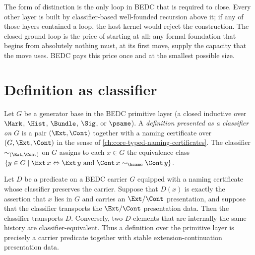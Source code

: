 \begin{remark}
\label{rem:ground-loop-must-close}
The form of distinction is the only loop in BEDC that is required to close. Every other layer is built by classifier-based well-founded recursion above it; if any of those layers contained a loop, the host kernel would reject the construction. The closed ground loop is the price of starting at all: any formal foundation that begins from absolutely nothing must, at its first move, supply the capacity that the move uses. BEDC pays this price once and at the smallest possible size.
\end{remark}

\section{Definition as classifier}
\label{sec:reflection-def-as-classifier}

\begin{definition}
\label{def:definition-as-classifier}
Let $G$ be a generator base in the BEDC primitive layer (a closed inductive over $\Mark$, $\Hist$, $\Bundle$, $\Sig$, or $\psame$). A \emph{definition presented as a classifier on $G$} is a pair $(\Ext, \Cont)$ together with a naming certificate over $(G, \Ext, \Cont)$ in the sense of \autoref{ch:core-typed-naming-certificates}. The classifier $\sim_{(\Ext, \Cont)}$ on $G$ assigns to each $x \in G$ the equivalence class $\{ y \in G \mid \Ext\,x \Leftrightarrow \Ext\,y \text{ and } \Cont\,x \sim_{\hsame} \Cont\,y \}$.
\end{definition}

\begin{theorem}
\label{thm:definition-classifier-correspondence}
Let $D$ be a predicate on a BEDC carrier $G$ equipped with a naming certificate whose classifier preserves the carrier. Suppose that $D(x)$ is exactly the assertion that $x$ lies in $G$ and carries an $\Ext/\Cont$ presentation, and suppose that the classifier transports the $\Ext/\Cont$ presentation data. Then the classifier transports $D$. Conversely, two $D$-elements that are internally the same history are classifier-equivalent. Thus a definition over the primitive layer is precisely a carrier predicate together with stable extension-continuation presentation data.
\end{theorem}

